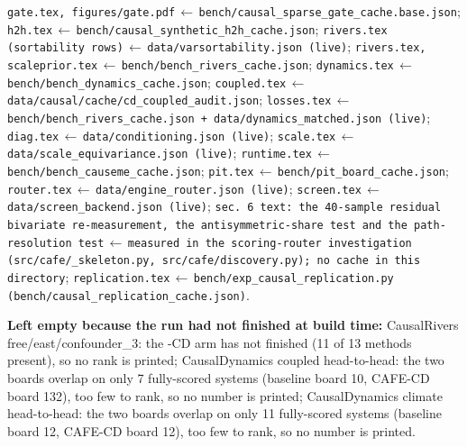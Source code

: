 {\footnotesize\raggedright\noindent
\texttt{gate.tex, figures/gate.pdf}$\,\leftarrow\,$\texttt{bench/causal\_sparse\_gate\_cache.base.json}; \texttt{h2h.tex}$\,\leftarrow\,$\texttt{bench/causal\_synthetic\_h2h\_cache.json}; \texttt{rivers.tex (sortability rows)}$\,\leftarrow\,$\texttt{data/varsortability.json (live)}; \texttt{rivers.tex, scaleprior.tex}$\,\leftarrow\,$\texttt{bench/bench\_rivers\_cache.json}; \texttt{dynamics.tex}$\,\leftarrow\,$\texttt{bench/bench\_dynamics\_cache.json}; \texttt{coupled.tex}$\,\leftarrow\,$\texttt{data/causal/cache/cd\_coupled\_audit.json}; \texttt{losses.tex}$\,\leftarrow\,$\texttt{bench/bench\_rivers\_cache.json + data/dynamics\_matched.json (live)}; \texttt{diag.tex}$\,\leftarrow\,$\texttt{data/conditioning.json (live)}; \texttt{scale.tex}$\,\leftarrow\,$\texttt{data/scale\_equivariance.json (live)}; \texttt{runtime.tex}$\,\leftarrow\,$\texttt{bench/bench\_causeme\_cache.json}; \texttt{pit.tex}$\,\leftarrow\,$\texttt{bench/pit\_board\_cache.json}; \texttt{router.tex}$\,\leftarrow\,$\texttt{data/engine\_router.json (live)}; \texttt{screen.tex}$\,\leftarrow\,$\texttt{data/screen\_backend.json (live)}; \texttt{sec. 6 text: the 40-sample residual bivariate re-measurement, the antisymmetric-share test and the path-resolution test}$\,\leftarrow\,$\texttt{measured in the scoring-router investigation (src/cafe/\_skeleton.py, src/cafe/discovery.py); no cache in this directory}; \texttt{replication.tex}$\,\leftarrow\,$\texttt{bench/exp\_causal\_replication.py (bench/causal\_replication\_cache.json)}.\par}
\vspace{3pt}
{\footnotesize\raggedright\noindent\textbf{Left empty because the run had not finished at build time:} CausalRivers free/east/confounder\_3: the \cafe{}-CD arm has not finished (11 of 13 methods present), so no rank is printed; CausalDynamics coupled head-to-head: the two boards overlap on only 7 fully-scored systems (baseline board 10, CAFE-CD board 132), too few to rank, so no number is printed; CausalDynamics climate head-to-head: the two boards overlap on only 11 fully-scored systems (baseline board 12, CAFE-CD board 12), too few to rank, so no number is printed.\par}
